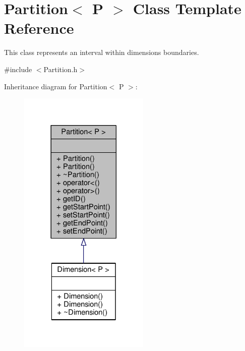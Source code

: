 \hypertarget{classPartition}{}\section{Partition$<$ P $>$ Class Template Reference}
\label{classPartition}


This class represents an interval within dimension\textquotesingle{}s boundaries.  




{\ttfamily \#include $<$Partition.\+h$>$}



Inheritance diagram for Partition$<$ P $>$\+:\nopagebreak
\begin{figure}[H]
\begin{center}
\leavevmode
\includegraphics[width=177pt]{classPartition__inherit__graph}
\end{center}
\end{figure}


